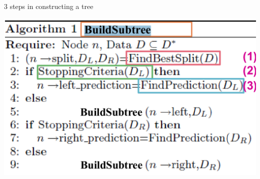 \begin{frame}[allowframebreaks]{3 steps in constructing a tree}
    \begin{center}
        \includegraphics[width=0.9\linewidth]{images/decision-trees/decision-trees-9.png}
    \end{center}
\end{frame}

